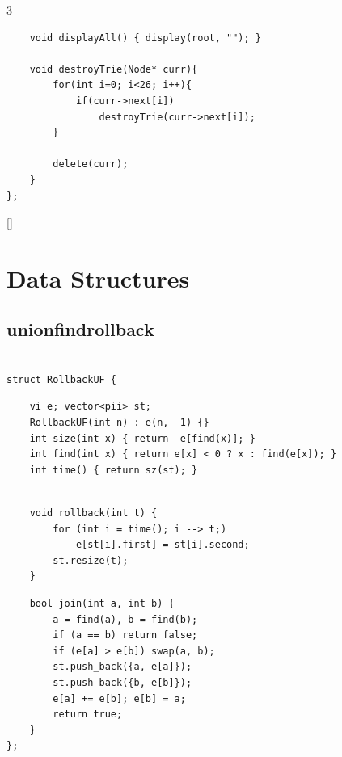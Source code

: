 \documentclass[twoside]{article}
\begin{document}
\begin{multicols*}{3}
\begin{verbatim}
    void displayAll() { display(root, ""); }

    void destroyTrie(Node* curr){
        for(int i=0; i<26; i++){
            if(curr->next[i])
                destroyTrie(curr->next[i]);
        }

        delete(curr);
    }
};

\end{verbatim}

{
[\vspace{2em}]
\section*{Data Structures}
}
{
\subsection*{unionfindrollback}
}
\begin{verbatim}

struct RollbackUF {
\end{verbatim}
\vspace{-12pt}
\begin{verbatim}
    vi e; vector<pii> st;
    RollbackUF(int n) : e(n, -1) {}
    int size(int x) { return -e[find(x)]; }
    int find(int x) { return e[x] < 0 ? x : find(e[x]); }
    int time() { return sz(st); }
    
\end{verbatim}
\vspace{-12pt}
\begin{verbatim}
    void rollback(int t) {
        for (int i = time(); i --> t;)
            e[st[i].first] = st[i].second;
        st.resize(t);
    }

\end{verbatim}
\vspace{-12pt}
\begin{verbatim}
    bool join(int a, int b) {
        a = find(a), b = find(b);
        if (a == b) return false;
        if (e[a] > e[b]) swap(a, b);
        st.push_back({a, e[a]});
        st.push_back({b, e[b]});
        e[a] += e[b]; e[b] = a;
        return true;
    }
};


\end{verbatim}
\end{multicols*}
\end{document}
